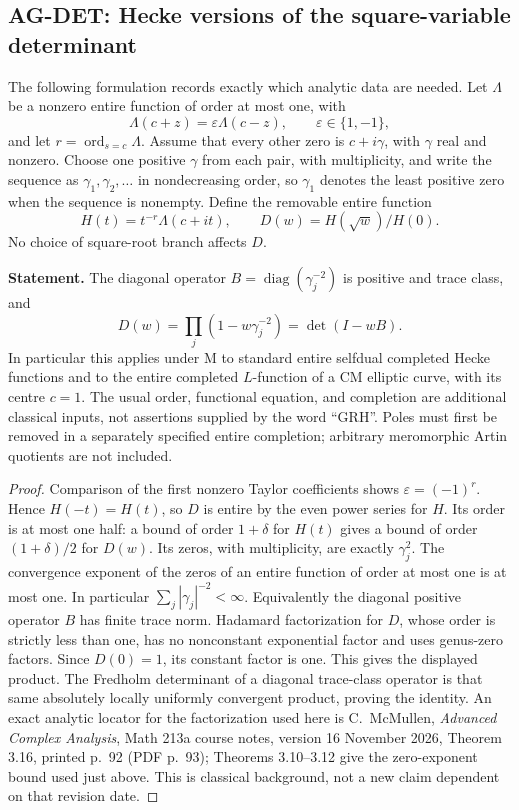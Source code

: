 \documentclass[11pt,a4paper]{article}
\begin{document}
\subsection{AG-DET: Hecke versions of the square-variable determinant}
\label{ag:det}

The following formulation records exactly which analytic data are needed.
Let $\Lambda$ be a nonzero entire function of order at most one, with
\[
 \Lambda(c+z)=\varepsilon\Lambda(c-z),\qquad
 \varepsilon\in\{1,-1\},
\]
and let $r=\operatorname{ord}_{s=c}\Lambda$. Assume that every other zero
is $c+i\gamma$, with $\gamma$ real and nonzero. Choose one positive
$\gamma$ from each pair, with multiplicity, and write the sequence as
$\gamma_1,\gamma_2,\ldots$ in nondecreasing order, so $\gamma_1$
denotes the least positive zero when the sequence is nonempty.
Define the removable entire function
\[
 H(t)=t^{-r}\Lambda(c+it),\qquad
 D(w)=H(\sqrt w)/H(0).
\]
No choice of square-root branch affects $D$.

\textbf{Statement.} The diagonal operator
$B=\operatorname{diag}(\gamma_j^{-2})$ is positive and trace class, and
\[
 D(w)=\prod_j(1-w\gamma_j^{-2})=\det(I-wB).
\]
In particular this applies under M to standard entire selfdual completed
Hecke functions and to the entire completed $L$-function of a CM elliptic
curve, with its centre $c=1$. The usual order, functional equation,
and completion are additional classical inputs, not assertions supplied
by the word ``GRH''. Poles must first be removed in a separately specified
entire completion; arbitrary meromorphic Artin quotients are not included.

\begin{proof}
Comparison of the first nonzero Taylor coefficients shows
$\varepsilon=(-1)^r$. Hence $H(-t)=H(t)$, so $D$ is entire by the even
power series for $H$. Its order is at most one half: a bound of order
$1+\delta$ for $H(t)$ gives a bound of order $(1+\delta)/2$ for $D(w)$.
Its zeros, with multiplicity, are exactly $\gamma_j^2$.
The convergence exponent of the zeros of an entire function of order at
most one is at most one. In particular
$\sum_j|\gamma_j|^{-2}<\infty$. Equivalently the diagonal positive
operator $B$ has finite trace norm. Hadamard factorization for $D$, whose
order is strictly less than one, has no nonconstant exponential factor
and uses genus-zero factors. Since $D(0)=1$, its constant factor is one.
This gives the displayed product. The Fredholm determinant of a diagonal
trace-class operator is that same absolutely locally uniformly convergent
product, proving the identity. An exact analytic locator for the
factorization used here is C.~McMullen, \emph{Advanced Complex Analysis},
Math 213a course notes, version 16 November 2026, Theorem 3.16,
printed p.~92 (PDF p.~93); Theorems 3.10--3.12 give the zero-exponent
bound used just above. This is classical background, not a new claim
dependent on that revision date.
\end{proof}
\end{document}
